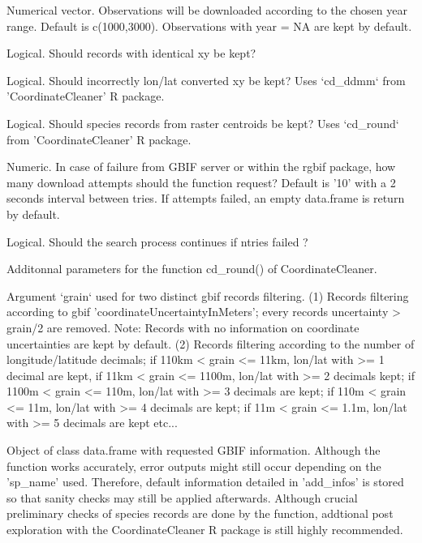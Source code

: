 \documentclass[a4paper]{book}
\begin{document}
\begin{Arguments}
\begin{ldescription}
\item[\code{time\_period}] Numerical vector. Observations will be downloaded according to the chosen
year range. Default is c(1000,3000). Observations with year = NA are kept by default.

\item[\code{identic\_xy}] Logical. Should records with identical xy be kept?

\item[\code{wConverted\_xy}] Logical. Should incorrectly lon/lat converted xy be kept?
Uses `cd\_ddmm` from 'CoordinateCleaner' R package.

\item[\code{centroids}] Logical. Should species records from raster centroids be kept?
Uses `cd\_round` from 'CoordinateCleaner' R package.

\item[\code{ntries}] Numeric. In case of failure from GBIF server or within the rgbif package, how many
download attempts should the function request? Default is '10' with a 2 seconds interval
between tries. If attempts failed, an empty data.frame is return by default.

\item[\code{error.skip}] Logical. Should the search process continues if ntries failed ?

\item[\code{...}] Additonnal parameters for the function cd\_round() of CoordinateCleaner.
\end{ldescription}
\end{Arguments}
%
\begin{Details}\relax
Argument `grain` used for two distinct gbif records filtering. (1) Records filtering
according to gbif 'coordinateUncertaintyInMeters'; every records uncertainty > grain/2
are removed. Note: Records with no information on coordinate uncertainties are kept by
default. (2) Records filtering according to the number of longitude/latitude decimals;
if 110km < grain <= 11km, lon/lat with >= 1 decimal are kept, if 11km < grain <= 1100m,
lon/lat with >= 2 decimals kept; if 1100m < grain <= 110m, lon/lat with >= 3 decimals
are kept; if 110m < grain <= 11m, lon/lat with >= 4 decimals are kept;
if 11m < grain <= 1.1m, lon/lat with >= 5 decimals are kept etc...
\end{Details}
%
\begin{Value}
Object of class data.frame with requested GBIF information. Although the function
works accurately, error outputs might still occur depending on the 'sp\_name' used.
Therefore, default information detailed in 'add\_infos' is stored so that sanity checks
may still be applied afterwards. Although crucial preliminary checks of species records
are done by the function, addtional post exploration with the CoordinateCleaner R
package is still highly recommended.
\end{Value}
\end{document}
